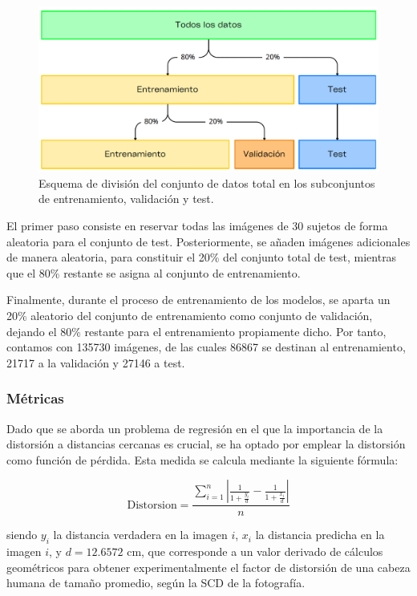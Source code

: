 \begin{figure}[h]
	\centering
	\includegraphics[scale=0.55]{imagenes/cap5/hold-out.png}
	\caption[Esquema de división del conjunto de datos.]{Esquema de división del conjunto de datos total en los subconjuntos de entrenamiento, validación y test.}
	\label{fig27}
\end{figure}

El primer paso consiste en reservar todas las imágenes de 30 sujetos de forma aleatoria para el conjunto de test. Posteriormente, se añaden imágenes adicionales de manera aleatoria, para constituir el 20\% del conjunto total de test, mientras que el 80\% restante se asigna al conjunto de entrenamiento.

Finalmente, durante el proceso de entrenamiento de los modelos, se aparta un 20\% aleatorio del conjunto de entrenamiento como conjunto de validación, dejando el 80\% restante para el entrenamiento propiamente dicho. Por tanto, contamos con 135730 imágenes, de las cuales 86867 se destinan al entrenamiento, 21717 a la validación y 27146 a test.


\subsubsection{Métricas}

Dado que se aborda un problema de regresión en el que la importancia de la distorsión a distancias cercanas es crucial, se ha optado por emplear la distorsión como función de pérdida. Esta medida se calcula mediante la siguiente fórmula:

\begin{equation}
	\text{Distorsion} = \displaystyle \frac{\sum_{i=1}^{n} | \displaystyle \frac{1}{1 + \displaystyle \frac{y_i}{d}} - \displaystyle \frac{1}{1 + \displaystyle \frac{x_i}{d}}|}{n}
\end{equation}

siendo $y_i$ la distancia verdadera en la imagen $i$, $x_i$ la distancia predicha en la imagen $i$, y $d = 12.6572 $ cm, que corresponde a un valor derivado de cálculos geométricos \cite{55} para obtener experimentalmente el factor de distorsión de una cabeza humana de tamaño promedio, según la SCD de la fotografía.

